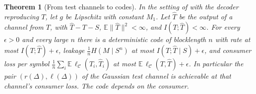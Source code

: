 \documentclass[11pt,onecolumn]{IEEEtran}
\newtheorem{theorem}{Theorem}
\newcommand{\E}{\mathbb{E}}
\begin{document}
\begin{theorem}[From test channels to codes]\label{thm:codes}
In the setting of \cite{part1} with the decoder reproducing $T$, let $g$ be Lipschitz
with constant $M_1$. Let $\hat T$ be the output of a channel from $T$, with $\hat T-T-S$,
$\E\|\hat T\|^2<\infty$, and $I(T;\hat T)<\infty$. For every $\epsilon>0$ and every large
$n$ there is a deterministic code of blocklength $n$ with rate at most
$I(T;\hat T)+\epsilon$, leakage $\tfrac1nH(M\mid S^n)$ at most $I(T;\hat T\mid S)+\epsilon$,
and consumer loss per symbol $\tfrac1n\sum_i\E\,\ell_{\mathcal C}(T_i,\hat T_i)$ at most
$\E\,\ell_{\mathcal C}(T,\hat T)+\epsilon$. In particular the pair $(r(\Delta),\ell(\Delta))$
of the Gaussian test channel is achievable at that channel's consumer loss. The code
depends on the consumer.
\end{theorem}
\end{document}
